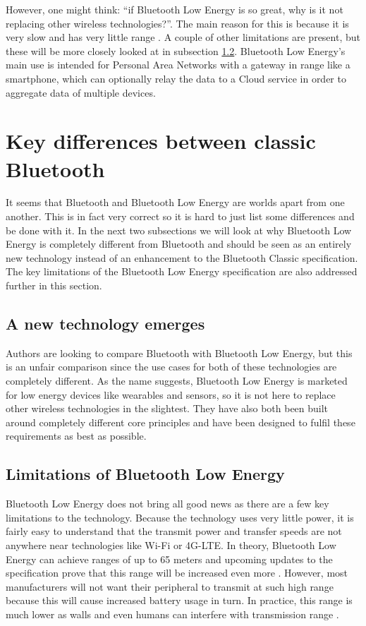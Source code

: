 \documentclass[pdftex,a4paper,12pt,twoside]{report}
\begin{document}
However, one might think: ``if Bluetooth Low Energy is so great, why is it not replacing other wireless technologies?''. The main reason for this is because it is very slow and has very little range \citep{heydon2012bluetooth}. A couple of other limitations are present, but these will be more closely looked at in subsection \ref{subsec:limitations}. Bluetooth Low Energy's main use is intended for Personal Area Networks \citep{bluetooth2016training} with a gateway in range like a smartphone, which can optionally relay the data to a Cloud service in order to aggregate data of multiple devices.

\section{Key differences between classic Bluetooth}
\label{sec:differencesclassic}
It seems that Bluetooth and Bluetooth Low Energy are worlds apart from one another. This is in fact very correct so it is hard to just list some differences and be done with it. In the next two subsections we will look at why Bluetooth Low Energy is completely different from Bluetooth and should be seen as an entirely new technology instead of an enhancement to the Bluetooth Classic specification. The key limitations of the Bluetooth Low Energy specification are also addressed further in this section.

\subsection{A new technology emerges}
\label{subsec:newtechnology}
Authors are looking to compare Bluetooth with Bluetooth Low Energy, but this is an unfair comparison since the use cases for both of these technologies are completely different. As the name suggests, Bluetooth Low Energy is marketed for low energy devices like wearables and sensors, so it is not here to replace other wireless technologies in the slightest. They have also both been built around completely different core principles \citep{bluetooth2016training} and have been designed to fulfil these requirements as best as possible.

\subsection{Limitations of Bluetooth Low Energy}
\label{subsec:limitations}
Bluetooth Low Energy does not bring all good news as there are a few key limitations to the technology. Because the technology uses very little power, it is fairly easy to understand that the transmit power and transfer speeds are not anywhere near technologies like Wi-Fi or 4G-LTE. In theory, Bluetooth Low Energy can achieve ranges of up to 65 meters and upcoming updates to the specification prove that this range will be increased even more \citep{heydon2012bluetooth}. However, most manufacturers will not want their peripheral to transmit at such high range because this will cause increased battery usage in turn. In practice, this range is much lower as walls and even humans can interfere with transmission range \citep{faragher2014analysis}.
\end{document}
